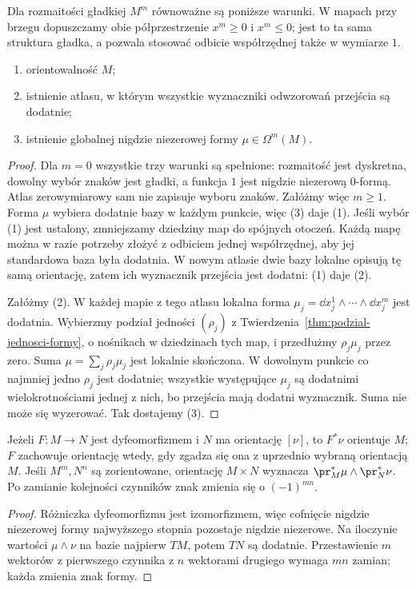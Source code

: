 \begin{twierdzenie}
\label{thm:orientacja-atlas-forma}
Dla rozmaitości gładkiej $M^m$ równoważne są
poniższe warunki. W mapach przy brzegu dopuszczamy
obie półprzestrzenie $x^m\geq0$ i $x^m\leq0$;
jest to ta sama struktura gładka, a pozwala stosować
odbicie współrzędnej także w wymiarze $1$.
\begin{enumerate}[leftmargin=*]
\item orientowalność $M$;
\item istnienie atlasu, w którym wszystkie wyznaczniki
      odwzorowań przejścia są dodatnie;
\item istnienie globalnej nigdzie niezerowej formy
      $\mu\in\Omega^m(M)$.
\end{enumerate}
\end{twierdzenie}
\begin{proof}
Dla $m=0$ wszystkie trzy warunki są spełnione:
rozmaitość jest dyskretna, dowolny wybór znaków jest
gładki, a funkcja $1$ jest nigdzie niezerową $0$-formą.
Atlas zerowymiarowy sam nie zapisuje wyboru znaków.
Załóżmy więc $m\geq1$.
Forma $\mu$ wybiera dodatnie bazy w każdym punkcie,
więc (3) daje (1). Jeśli wybór (1) jest ustalony,
zmniejszamy dziedziny map do spójnych otoczeń.
Każdą mapę można w razie potrzeby złożyć z odbiciem
jednej współrzędnej, aby jej standardowa baza była
dodatnia. W nowym atlasie dwie bazy lokalne opisują
tę samą orientację, zatem ich wyznacznik przejścia
jest dodatni: (1) daje (2).

Załóżmy (2). W każdej mapie z tego atlasu lokalna
forma $\mu_j=\dd x_j^1\wedge\cdots\wedge\dd x_j^m$
jest dodatnia. Wybierzmy podział jedności $(\rho_j)$
z Twierdzenia~\ref{thm:podzial-jednosci-formy},
o nośnikach w dziedzinach tych map, i przedłużmy
$\rho_j\mu_j$ przez zero. Suma
$\mu=\sum_j\rho_j\mu_j$ jest lokalnie skończona.
W dowolnym punkcie co najmniej jedno $\rho_j$ jest
dodatnie; wszystkie występujące $\mu_j$ są dodatnimi
wielokrotnościami jednej z nich, bo przejścia
mają dodatni wyznacznik. Suma nie może się
wyzerować. Tak dostajemy (3).
\end{proof}

\begin{stwierdzenie}
\label{prop:orientacja-iloczyn-pullback}
Jeżeli $F:M\to N$ jest dyfeomorfizmem i $N$ ma
orientację $[\nu]$, to $F^*\nu$ orientuje $M$;
$F$ zachowuje orientację wtedy, gdy zgadza się ona
z uprzednio wybraną orientacją $M$. Jeśli $M^m,N^n$
są zorientowane, orientację $M\times N$ wyznacza
$\pr_M^*\mu\wedge\pr_N^*\nu$.
Po zamianie kolejności czynników znak zmienia się
o $(-1)^{mn}$.
\end{stwierdzenie}
\begin{proof}
Różniczka dyfeomorfizmu jest izomorfizmem, więc
cofnięcie nigdzie niezerowej formy najwyższego stopnia
pozostaje nigdzie niezerowe. Na iloczynie wartości
$\mu\wedge\nu$ na bazie najpierw $TM$, potem $TN$
są dodatnie. Przestawienie $m$ wektorów z pierwszego
czynnika z $n$ wektorami drugiego wymaga $mn$
zamian; każda zmienia znak formy.
\end{proof}

